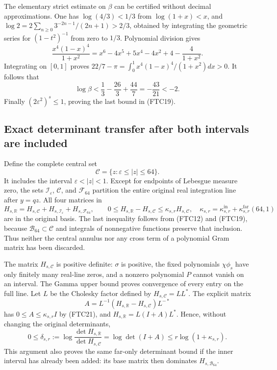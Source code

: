 \documentclass[11pt,a4paper]{article}
\begin{document}
The elementary strict estimate on $\beta$ can be certified without decimal
approximations.  One has $\log(4/3)<1/3$ from
$\log(1+x)<x$, and
$\log2=2\sum_{n\ge0}3^{-2n-1}/(2n+1)>2/3$, obtained by integrating the
geometric series for $(1-t^2)^{-1}$ from zero to $1/3$.
Polynomial division gives
\[
 \frac{x^4(1-x)^4}{1+x^2}
 =x^6-4x^5+5x^4-4x^2+4-\frac4{1+x^2}.
\]
Integrating on $[0,1]$ proves
$22/7-\pi=\int_0^1x^4(1-x)^4/(1+x^2)dx>0$.
It follows that
\[
 \log\beta<\frac13-\frac{26}3+\frac{44}7
 =-\frac{43}{21}<-2.
\]
Finally $(2\varepsilon^2)^s\le1$, proving the last bound in (FTC19).

\subsection{Exact determinant transfer after both intervals are included}

Define the complete central set
\begin{equation}
 \mathcal C=\{z:\varepsilon\le|z|\le64\}.
 \tag{FTC20}
\end{equation}
It includes the interval $\varepsilon<|z|<1$.  Except for endpoints of
Lebesgue measure zero, the sets $\mathcal I_\varepsilon$, $\mathcal C$,
and $\mathcal F_{64}$ partition the entire original real integration
line after $y=qz$.  All four matrices in
\begin{equation}
 H_{s,\mathbb R}=H_{s,\mathcal C}
 +H_{s,\mathcal I_\varepsilon}+H_{s,\mathcal F_{64}},\qquad
 0\le H_{s,\mathbb R}-H_{s,\mathcal C}
 \le\kappa_{s,r}H_{s,\mathcal C},\quad
 \kappa_{s,r}=\kappa_{s,r}^{\mathrm{in}}
 +\kappa_{s,r}^{\mathrm{far}}(64,1)
 \tag{FTC21}
\end{equation}
are in the original basis.  The last inequality follows from (FTC12) and
(FTC19), because $\mathcal B_{64}\subset\mathcal C$ and integrals of
nonnegative functions preserve that inclusion.  Thus neither the central
annulus nor any cross term of a polynomial Gram matrix has been discarded.

The matrix $H_{s,\mathcal C}$ is positive definite: $\sigma$ is positive,
the fixed polynomials $\chi\phi_s$ have only finitely many real-line
zeros, and a nonzero polynomial $P$ cannot vanish on an interval.
The Gamma upper bound proves convergence of every entry on the full line.
Let $L$ be the Cholesky factor defined by
$H_{s,\mathcal C}=LL^*$.  The explicit matrix
\[
 A=L^{-1}(H_{s,\mathbb R}-H_{s,\mathcal C})L^{-*}
\]
has $0\le A\le\kappa_{s,r}I$ by (FTC21), and
$H_{s,\mathbb R}=L(I+A)L^*$.  Hence, without changing the original
determinants,
\begin{equation}
 0\le\delta_{s,r}:=
 \log\frac{\det H_{s,\mathbb R}}{\det H_{s,\mathcal C}}
 =\log\det(I+A)\le r\log(1+\kappa_{s,r}).
 \tag{FTC22}
\end{equation}
This argument also proves the same far-only determinant bound if the
inner interval has already been added: its base matrix then dominates
$H_{s,\mathcal B_{64}}$.
\end{document}
